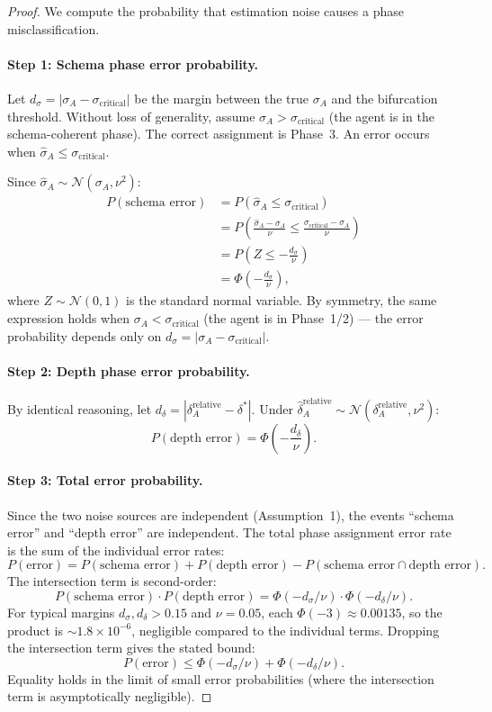 \begin{proof}
We compute the probability that estimation noise causes a phase
misclassification.

\paragraph{Step 1: Schema phase error probability.}
Let $d_\sigma = |\sigma_A - \sigma_{\text{critical}}|$ be the margin
between the true $\sigma_A$ and the bifurcation threshold. Without
loss of generality, assume $\sigma_A > \sigma_{\text{critical}}$ (the
agent is in the schema-coherent phase). The correct assignment is
Phase~3. An error occurs when $\hat{\sigma}_A \leq \sigma_{\text{critical}}$.

Since $\hat{\sigma}_A \sim \mathcal{N}(\sigma_A, \nu^2)$:
\begin{align*}
P(\text{schema error}) &= P(\hat{\sigma}_A \leq \sigma_{\text{critical}}) \\
&= P\!\left(\frac{\hat{\sigma}_A - \sigma_A}{\nu} \leq \frac{\sigma_{\text{critical}} - \sigma_A}{\nu}\right) \\
&= P\!\left(Z \leq -\frac{d_\sigma}{\nu}\right) \\
&= \Phi\!\left(-\frac{d_\sigma}{\nu}\right),
\end{align*}
where $Z \sim \mathcal{N}(0,1)$ is the standard normal variable. By
symmetry, the same expression holds when $\sigma_A < \sigma_{\text{critical}}$
(the agent is in Phase~1/2) — the error probability depends only on
$d_\sigma = |\sigma_A - \sigma_{\text{critical}}|$.

\paragraph{Step 2: Depth phase error probability.}
By identical reasoning, let $d_\delta = |\delta_A^{\text{relative}} - \delta^*|$.
Under $\hat{\delta}_A^{\text{relative}} \sim \mathcal{N}(\delta_A^{\text{relative}}, \nu^2)$:
\[
P(\text{depth error}) = \Phi\!\left(-\frac{d_\delta}{\nu}\right).
\]

\paragraph{Step 3: Total error probability.}
Since the two noise sources are independent (Assumption~1), the events
``schema error'' and ``depth error'' are independent. The total phase
assignment error rate is the sum of the individual error rates:
\[
P(\text{error}) = P(\text{schema error}) + P(\text{depth error})
- P(\text{schema error} \cap \text{depth error}).
\]
The intersection term is second-order:
\[
P(\text{schema error}) \cdot P(\text{depth error})
= \Phi(-d_\sigma/\nu) \cdot \Phi(-d_\delta/\nu).
\]
For typical margins $d_\sigma, d_\delta > 0.15$ and $\nu = 0.05$,
each $\Phi(-3) \approx 0.00135$, so the product is $\sim 1.8 \times 10^{-6}$,
negligible compared to the individual terms. Dropping the intersection
term gives the stated bound:
\[
P(\text{error}) \leq \Phi(-d_\sigma/\nu) + \Phi(-d_\delta/\nu).
\]
Equality holds in the limit of small error probabilities (where the
intersection term is asymptotically negligible).


\end{proof}
